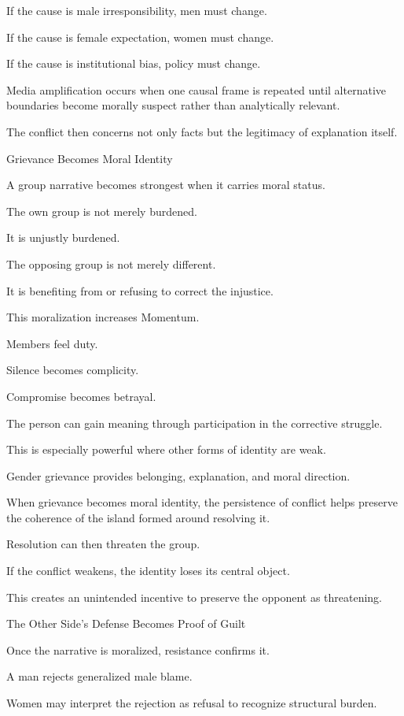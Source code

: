 If the cause is male irresponsibility, men must change.

If the cause is female expectation, women must change.

If the cause is institutional bias, policy must change.

Media amplification occurs when one causal frame is repeated until alternative boundaries become morally suspect rather than analytically relevant.

The conflict then concerns not only facts but the legitimacy of explanation itself.

Grievance Becomes Moral Identity

A group narrative becomes strongest when it carries moral status.

The own group is not merely burdened.

It is unjustly burdened.

The opposing group is not merely different.

It is benefiting from or refusing to correct the injustice.

This moralization increases Momentum.

Members feel duty.

Silence becomes complicity.

Compromise becomes betrayal.

The person can gain meaning through participation in the corrective struggle.

This is especially powerful where other forms of identity are weak.

Gender grievance provides belonging, explanation, and moral direction.

When grievance becomes moral identity, the persistence of conflict helps preserve the coherence of the island formed around resolving it.

Resolution can then threaten the group.

If the conflict weakens, the identity loses its central object.

This creates an unintended incentive to preserve the opponent as threatening.

The Other Side’s Defense Becomes Proof of Guilt

Once the narrative is moralized, resistance confirms it.

A man rejects generalized male blame.

Women may interpret the rejection as refusal to recognize structural burden.

